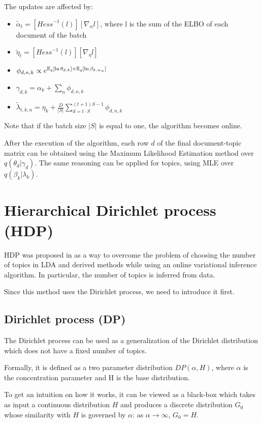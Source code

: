 The updates are affected by:
\begin{itemize}
    \item $\tilde{\alpha}_t = [\mathit{Hess}^{-1}(l)] [\nabla_{\alpha} l]$, where l is the sum of the ELBO of each document of the batch
    \item $\tilde{\eta}_t = [\mathit{Hess}^{-1}(l)] [\nabla_{\eta} l]$
    \item $\phi_{d,n,k} \propto e^{\operatorname*{\mathbb{E}}_q[\ln \theta_{d,k}] + \operatorname*{\mathbb{E}}_q[\ln \beta_{k, w_n}]}$
    \item $\gamma_{d,k} = \alpha_k + \sum_n \phi_{d,n,k}$
    \item $\tilde{\lambda}_{t,k,n} = \eta_k + \frac{D}{|S|} \sum_{d = t \cdot S}^{(t+1) S - 1} \phi_{d,n,k} $
\end{itemize}

Note that if the batch size $|S|$ is equal to one, the algorithm becomes online.

After the execution of the algorithm, each row $d$ of the final document-topic matrix
can be obtained using the Maximum Likelihood Estimation method over $q(\theta_d | \gamma_d)$.
The same reasoning can be applied for topics, using MLE over $q(\beta_k | \lambda_k)$.


\section{Hierarchical Dirichlet process (HDP)}

HDP was proposed in \cite{DBLP:journals/jmlr/WangPB11}
as a way to overcome the problem of choosing the number
of topics in LDA and derived methods
while using an online variational inference algorithm.
In particular, the number of topics is inferred from data.

Since this method uses the Dirichlet process, we need to introduce it first.

\subsection{Dirichlet process (DP)} \label{dipro}
The Dirichlet process can be used as a generalization of the Dirichlet distribution
which does not have a fixed number of topics.

Formally, it is defined as a two parameter distribution $\mathit{DP}(\alpha, H)$,
where $\alpha$ is the concentration parameter and H is the base distribution.

To get an intuition on how it works, it can be viewed as a black-box
which takes as input a continuous distribution $H$ and produces a discrete distribution $G_0$
whose similarity with $H$ is governed by $\alpha$: as $\alpha \to \infty$, $G_0 = H$.

